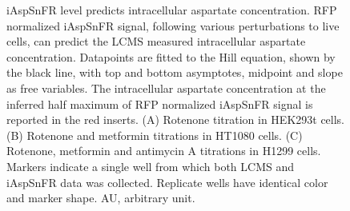 \documentclass[9pt,lineno]{elife}
\begin{document}
\begin{figure}[ht!]
\centering
{}
\caption{
iAspSnFR level predicts intracellular aspartate concentration.
RFP normalized iAspSnFR signal, following various perturbations to live cells, can predict the LCMS measured intracellular aspartate concentration.
Datapoints are fitted to the Hill equation, shown by the black line, with top and bottom asymptotes, midpoint and slope as free variables.
The intracellular aspartate concentration at the inferred half maximum of RFP normalized iAspSnFR signal is reported in the red inserts.
(A) Rotenone titration in HEK293t cells.
(B) Rotenone and metformin titrations in HT1080 cells.
(C) Rotenone, metformin and antimycin A titrations in H1299 cells.
Markers indicate a single well from which both LCMS and iAspSnFR data was collected.
Replicate wells have identical color and marker shape.
AU, arbitrary unit.
}
\label{fig:Fig3}
\label{figsupp:f3S1}
\end{figure}
\end{document}
